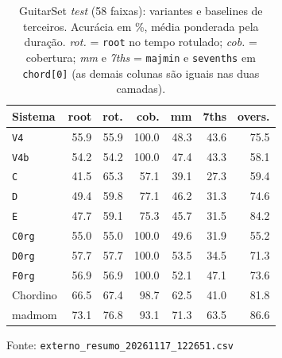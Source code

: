 \begin{table}[t]
  \centering
  \caption{GuitarSet \emph{test} (58 faixas): variantes e baselines de terceiros. Acurácia em \%, média ponderada pela duração. \emph{rot.} = \texttt{root} no tempo rotulado; \emph{cob.} = cobertura; \emph{mm} e \emph{7ths} = \texttt{majmin} e \texttt{sevenths} em \texttt{chord[0]} (as demais colunas são iguais nas duas camadas).}
  \label{tab:principal}
  \footnotesize
  \begin{tabular}{lrrrrrr}
    \toprule
    Sistema & root & rot. & cob. & mm & 7ths & overs. \\
    \midrule
    \texttt{V4} & 55.9 & 55.9 & 100.0 & 48.3 & 43.6 & 75.5 \\
    \texttt{V4b} & 54.2 & 54.2 & 100.0 & 47.4 & 43.3 & 58.1 \\
    \texttt{C} & 41.5 & 65.3 & 57.1 & 39.1 & 27.3 & 59.4 \\
    \texttt{D} & 49.4 & 59.8 & 77.1 & 46.2 & 31.3 & 74.6 \\
    \texttt{E} & 47.7 & 59.1 & 75.3 & 45.7 & 31.5 & 84.2 \\
    \texttt{C0rg} & 55.0 & 55.0 & 100.0 & 49.6 & 31.9 & 55.2 \\
    \texttt{D0rg} & 57.7 & 57.7 & 100.0 & 53.5 & 34.5 & 71.3 \\
    \texttt{F0rg} & 56.9 & 56.9 & 100.0 & 52.1 & 47.1 & 73.6 \\
    \midrule
    Chordino & 66.5 & 67.4 & 98.7 & 62.5 & 41.0 & 81.8 \\
    madmom & 73.1 & 76.8 & 93.1 & 71.3 & 63.5 & 86.6 \\
    \bottomrule
  \end{tabular}
  \vspace{2pt}
  \parbox{\linewidth}{\footnotesize Fonte: \texttt{externo\_resumo\_20261117\_122651.csv}}
\end{table}
